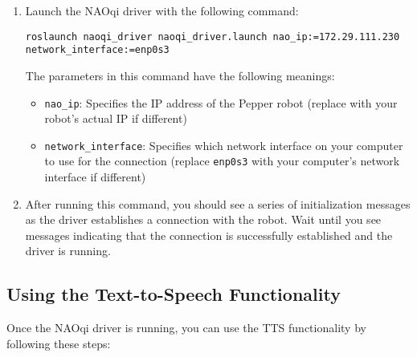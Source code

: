 \documentclass{CSSRforAfrica}
\begin{document}
\begin{enumerate}
    \item Launch the NAOqi driver with the following command:
    \begin{lstlisting}[style=commandstyle]
    roslaunch naoqi_driver naoqi_driver.launch nao_ip:=172.29.111.230 network_interface:=enp0s3
    \end{lstlisting}
    
    The parameters in this command have the following meanings:
    \begin{itemize}
        \item \texttt{nao\_ip}: Specifies the IP address of the Pepper robot (replace with your robot's actual IP if different)
        \item \texttt{network\_interface}: Specifies which network interface on your computer to use for the connection (replace \texttt{enp0s3} with your computer's network interface if different)
    \end{itemize}

    \item After running this command, you should see a series of initialization messages as the driver establishes a connection with the robot. Wait until you see messages indicating that the connection is successfully established and the driver is running.
\end{enumerate}

\subsection{Using the Text-to-Speech Functionality}

Once the NAOqi driver is running, you can use the TTS functionality by following these steps:
\end{document}
